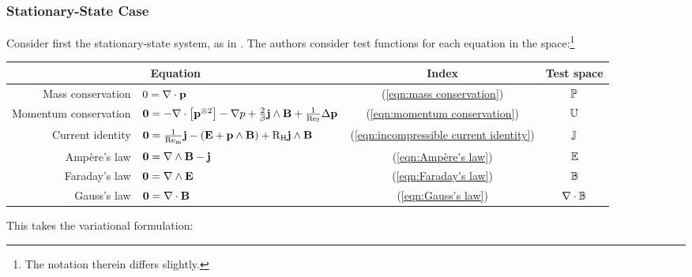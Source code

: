 \subsubsection*{Stationary-State Case}
    Consider first the stationary-state system, as in \cite{LHF22}. The authors consider test functions for each equation in the space:\footnote{The notation therein differs slightly.}
    \begin{center}\begin{tabular}{ r l c | c }
        \multicolumn{2}{c}{Equation}  &  Index  &  Test space  \\
        \hline\hline
        Mass conservation  &  $0  =  \nabla\cdot\mathbf{p}$  &  (\ref{eqn:mass conservation})  &  $\mathbb{P}$  \\
        Momentum conservation  &  $\mathbf{0} 
         =  - \nabla\cdot\left[\mathbf{p}^{\otimes 2}\right] - \nabla p + \frac{2}{\beta}\mathbf{j}\wedge\mathbf{B} + \frac{1}{\mathrm{Re}_{\mathrm{f}}}\Delta\mathbf{p}$  &  (\ref{eqn:momentum conservation})  &  $\mathbb{U}$  \\
        \hline
        Current identity  &  $\mathbf{0}  =  \frac{1}{\mathrm{Re}_{\mathrm{m}}}\mathbf{j} - (\mathbf{E} + \mathbf{p}\wedge\mathbf{B}) + \mathrm{R}_{\mathrm{H}}\mathbf{j}\wedge\mathbf{B}$  &  (\ref{eqn:incompressible current identity})  &  $\mathbb{J}$  \\
        \hline
        Ampère's law  &  $\mathbf{0}  =  \nabla\wedge\mathbf{B} - \mathbf{j}$  &  (\ref{eqn:Ampère's law})  &  $\mathbb{E}$  \\
        Faraday's law  &  $\mathbf{0}  =  \nabla\wedge\mathbf{E}$  &  (\ref{eqn:Faraday's law})  &  $\mathbb{B}$  \\
        Gauss's law  &  $\mathbf{0}  =  \nabla\cdot\mathbf{B}$  &  (\ref{eqn:Gauss's law})  &  $\nabla\cdot\mathbb{B}$  \\
    \end{tabular}\end{center}
    This takes the variational formulation: 
